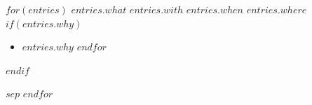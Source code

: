 $for(entries)$
\cvevent
  {$entries.what$} %
  {$entries.with$} %
  {$entries.when$} %
  {$entries.where$} %
$if(entries.why)$
\begin{itemize}
$for(entries.why)$\item $entries.why$
$endfor$\end{itemize}
$endif$

$sep$\divider
$endfor$

